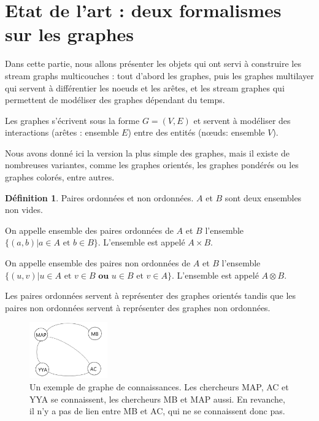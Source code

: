 \documentclass[11pt,a4paper]{article}
\theoremstyle{definition}
\newtheorem{defn}{Définition}
\theoremstyle{remark}
\theoremstyle{remark}
\def \stgms {stream graphs multicouches}
\begin{document}
	
	
\section{Etat de l'art : deux formalismes sur les graphes}
\indent

Dans cette partie, nous allons présenter les objets qui ont servi à construire les \stgms{} : tout d'abord les graphes, puis les graphes multilayer qui servent à différentier les noeuds et les arêtes, et les stream graphes qui permettent de modéliser des graphes dépendant du temps.

Les graphes s'écrivent sous la forme $G=(V,E)$ et servent à modéliser des interactions (arêtes : ensemble $E$) entre des entités (nœuds: ensemble $V$). 

Nous avons donné ici la version la plus simple des graphes, mais il existe de nombreuses variantes, comme les graphes orientés, les graphes pondérés ou les graphes colorés, entre autres.

\begin{defn}{Paires ordonnées et non ordonnées.}
	$A$ et $B$ sont deux ensembles non vides.
	
	On appelle ensemble des paires ordonnées de $A$ et $B$ l'ensemble $\{ (a,b) | a \in A \text{ et } b \in B\}$. L'ensemble est appelé $A \times B$.
	
	On appelle ensemble des paires non ordonnées de $A$ et $B$ l'ensemble $\{(u,v) | u \in A \text{ et } v\in B \textbf{ ou } u \in B \text{ et } v\in A\}$. L'ensemble est appelé $A\otimes B$.
\end{defn}

	Les paires ordonnées servent à représenter des graphes orientés tandis que les paires non ordonnées servent à représenter des graphes non ordonnées.

\begin{figure}[H]
	\centering
	\includegraphics[width=0.3\textwidth]{exGraphe.JPG}
	\caption{Un exemple de graphe de connaissances. Les chercheurs MAP, AC et YYA se connaissent, les chercheurs MB et MAP aussi. En revanche, il n'y a pas de lien entre MB et AC, qui ne se connaissent donc pas.}
\end{figure}
\end{document}
